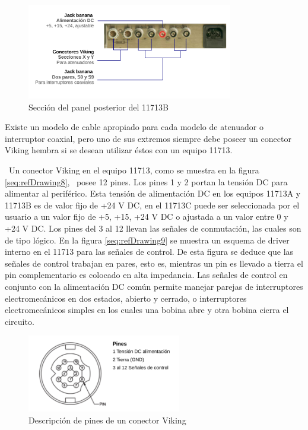 \begin{figure}[h!]
	\centering
	\includegraphics[width=0.8\textwidth]{Imagenes/SeccionPanelPosterior11713.pdf}
	\caption{Sección del panel posterior del 11713B}
	\label{Fig:SeccionPanelPosterior11713}
\end{figure}

Existe un modelo de cable apropiado para cada modelo de atenuador o interruptor coaxial, pero uno de sus extremos siempre debe poseer un conector Viking hembra si se desean utilizar éstos con un equipo 11713. 

\ Un conector Viking en el equipo 11713, como se muestra en la figura \ref{seq:refDrawing8}, \ posee 12 pines. Los pines 1 y 2 portan la tensión DC para alimentar al periférico. Esta tensión de alimentación DC en los equipos 11713A y
11713B es de valor fijo de +24 V DC, en el 11713C puede ser seleccionada por el usuario a un valor fijo de +5, +15, +24 V DC o ajustada a un valor entre 0 y +24 V DC. Los pines del 3 al 12 llevan las señales de conmutación, las cuales son de tipo lógico. En la figura \ref{seq:refDrawing9} se muestra un esquema de driver interno en el 11713 para las señales
de control. De esta figura se deduce que las señales de control trabajan en pares, esto es, mientras un pin es llevado a tierra el pin complementario es colocado en alta impedancia. Las señales de control en conjunto con la alimentación DC común permite manejar parejas de interruptores electromecánicos en dos estados, abierto y cerrado, o interruptores electromecánicos simples en los cuales una bobina abre y otra bobina cierra el circuito.

\begin{figure}[h!]
	\centering
	\includegraphics[width=0.6\textwidth]{Imagenes/PinoutConectorViking.pdf}
	\caption{Descripción de pines de un conector Viking}
	\label{Fig:PinoutViking}
\end{figure} 

